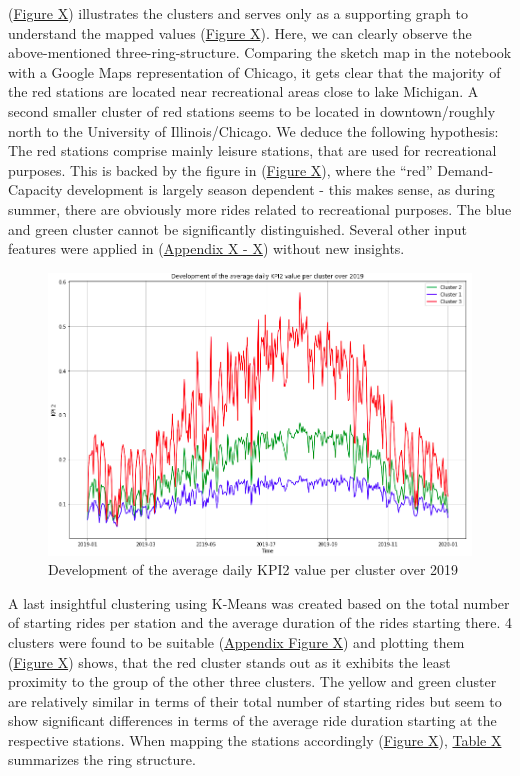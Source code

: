(\hyperref[BCABB8]{Figure X}) illustrates the clusters and serves only as a supporting graph to understand the mapped values (\hyperref[BCABB9]{Figure X}). Here, we can clearly observe the above-mentioned three-ring-structure. Comparing the sketch map in the notebook with a Google Maps representation of Chicago, it gets clear that the majority of the red stations are located near recreational areas close to lake Michigan. A second smaller cluster of red stations seems to be located in downtown/roughly north to the University of Illinois/Chicago. We deduce the following hypothesis: The red stations comprise mainly leisure stations, that are used for recreational purposes. This is backed by the figure in  (\hyperref[BCABB10]{Figure X}), where the “red” Demand-Capacity development is largely season dependent - this makes sense, as during summer, there are obviously more rides related to recreational purposes. The blue and green cluster cannot be significantly distinguished. Several other input features were applied in  (\hyperref[BCAPP8]{Appendix X - X}) without new insights.

\begin{figure}[H]
   \centering
    \includegraphics[width=0.7\linewidth]{./Figures/BC_ABB10.png}
    \caption{Development of the average daily KPI2 value per cluster over 2019}
    \label{BCABB10}
\end{figure}

A last insightful clustering using K-Means was created based on the total number of starting rides per station and the average duration of the rides starting there. 4 clusters were found to be suitable (\hyperref[BCABB11]{Appendix Figure X}) and plotting them (\hyperref[BCABB12]{Figure X}) shows, that the red cluster stands out as it exhibits the least proximity to the group of the other three clusters. The yellow and green cluster are relatively similar in terms of their total number of starting rides but seem to show significant differences in terms of the average ride duration starting at the respective stations. When mapping the stations accordingly (\hyperref[BCABB13]{Figure X}), \hyperref[clusterRingsTable]{Table X} summarizes the ring structure.

